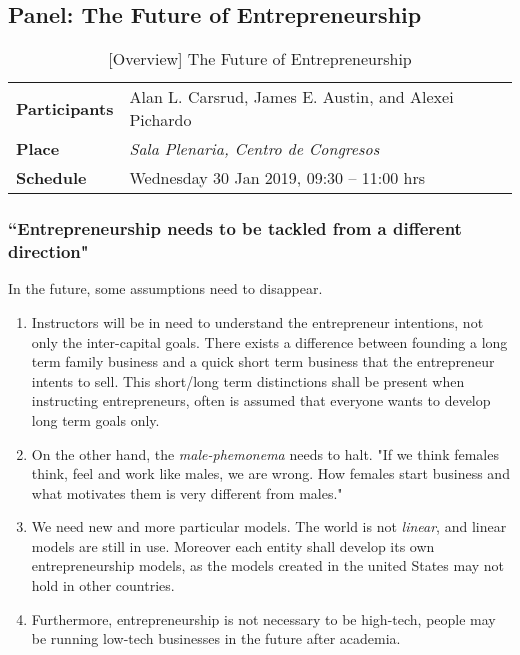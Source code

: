 \documentclass[11pt,a4paper]{article}
\begin{document}
\subsection{Panel: The Future of Entrepreneurship}\label{sec:panel1}

\parencite{Carsrud2019}
\begin{table}[h] %
\centering
\begin{tabular}{|l|l|}
\hline
\textbf{Participants} &  Alan L. Carsrud, James E. Austin, and Alexei Pichardo \\
\textbf{Place}        & \emph{Sala Plenaria, Centro de Congresos} \\
\textbf{Schedule}     & Wednesday 30 Jan 2019, 09:30 – 11:00 hrs \\
\hline
\end{tabular}
\caption{[Overview] The Future of Entrepreneurship}\label{tab:table}
\end{table}

\subsubsection*{``Entrepreneurship needs to be tackled from a different direction"}
In the future, some assumptions need to disappear.

\begin{enumerate}
	\item{
		Instructors will be in need to understand the entrepreneur intentions, not only the inter-capital goals. There exists a difference between founding a long term family business and a quick short term business that the entrepreneur intents to sell. This short/long term distinctions shall be present when instructing entrepreneurs, often is assumed that everyone wants to develop long term goals only.
	}
	\item{
		On the other hand, the \emph{male-phemonema} needs to halt. "If we think females think, feel and work like males, we are wrong. How females start business and what motivates them is very different from males." \parencite{Carsrud2019} 
	}
	\item{
		We need new and more particular models. The world is not \emph{linear}, and linear models are still in use. Moreover each entity shall develop its own entrepreneurship models, as the models created in the united States may not hold in other countries.
	}
	\item{
		Furthermore, entrepreneurship is not necessary to be high-tech, people may be running low-tech businesses in the future after academia.
	}
\end{enumerate}
\end{document}
